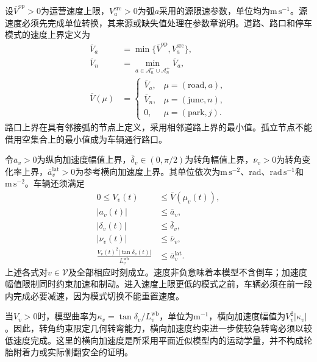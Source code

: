 设$\overline V^{\mathrm{op}}>0$为运营速度上限，$V_a^{\mathrm{src}}>0$为弧$a$采用的源限速参数，单位均为$\mathrm{m\,s^{-1}}$。源速度必须先完成单位转换，其来源或缺失值处理在参数章说明。道路、路口和停车模式的速度上界定义为
\begin{equation}
 \begin{split}
 \overline V_a&=\min\{\overline V^{\mathrm{op}},V_a^{\mathrm{src}}\},\\
 \overline V_n&=\min_{a\in\mathcal A_n^-\cup\mathcal A_n^+}
                      \overline V_a,\\
 \overline V(\mu)&=
 \begin{cases}
 \overline V_a,&\mu=(\mathrm{road},a),\\
 \overline V_n,&\mu=(\mathrm{junc},n),\\
 0,&\mu=(\mathrm{park},j).
 \end{cases}
 \end{split}
 \label{s0407:mode_speed_limit}
\end{equation}
路口上界在具有邻接弧的节点上定义，采用相邻道路上界的最小值。孤立节点不能借用空集合上的最小值成为车辆通行路口。

令$\overline a_v>0$为纵向加速度幅值上界，$\overline\delta_v\in(0,\pi/2)$为转角幅值上界，$\overline\nu_v>0$为转角变化率上界，$\overline a_v^{\mathrm{lat}}>0$为参考横向加速度上界。其单位依次为$\mathrm{m\,s^{-2}}$、$\mathrm{rad}$、$\mathrm{rad\,s^{-1}}$和$\mathrm{m\,s^{-2}}$。车辆还须满足
\begin{subequations}
\label{s0407:vehicle_control_bounds}
\begin{align}
 0\le V_v(t)&\le\overline V(\mu_v(t)),
 \label{s0407:speed_bound}\\
 |a_v(t)|&\le\overline a_v,
 \label{s0407:acceleration_bound}\\
 |\delta_v(t)|&\le\overline\delta_v,
 \label{s0407:steering_bound}\\
 |\nu_v(t)|&\le\overline\nu_v,
 \label{s0407:steering_rate_bound}\\
 \frac{V_v(t)^2|\tan\delta_v(t)|}{L_v^{\mathrm{wb}}}
 &\le\overline a_v^{\mathrm{lat}}.
 \label{s0407:lateral_acceleration_bound}
\end{align}
\end{subequations}
上述各式对$v\in\mathcal V$及全部相应时刻成立。速度非负意味着本模型不含倒车；加速度幅值限制同时约束加速和制动。进入速度上限更低的模式之前，车辆必须在前一段内完成必要减速，因为模式切换不能重置速度。

当$V_v>0$时，模型曲率为$\kappa_v=\tan\delta_v/L_v^{\mathrm{wb}}$，单位为$\mathrm{m^{-1}}$，横向加速度幅值为$V_v^2|\kappa_v|$。因此，转角约束限定几何转弯能力，横向加速度约束进一步使较急转弯必须以较低速度完成。这里的横向加速度是所采用平面近似模型内的运动学量，并不构成轮胎附着力或实际侧翻安全的证明。

